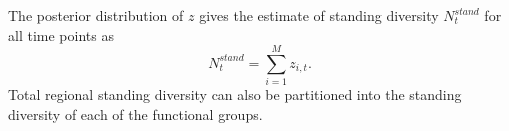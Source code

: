 \documentclass[12pt,letterpaper]{article}
\begin{document}
The posterior distribution of \(z\) gives the estimate of standing diversity \(N^{stand}_{t}\) for all time points as 
\begin{equation}
  N^{stand}_{t} = \sum_{i = 1}^{M} z_{i, t}.
  \label{eq:stand_est}
\end{equation}
Total regional standing diversity can also be partitioned into the standing diversity of each of the functional groups.

\end{document}
